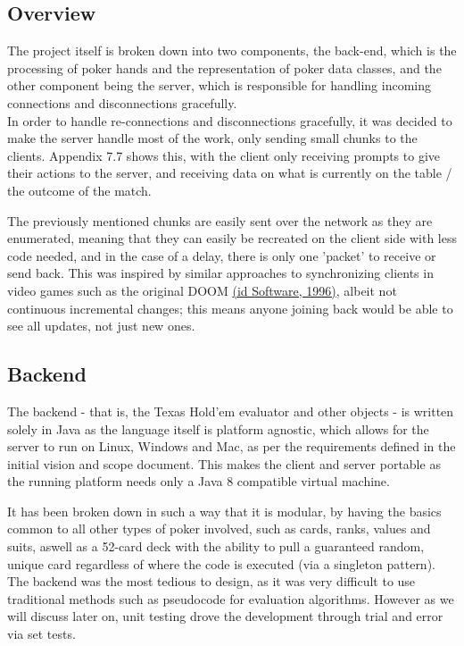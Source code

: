 \documentclass[11pt]{article}
\begin{document}
\subsection{Overview}

The project itself is broken down into two components, the back-end, which is the processing of poker hands and the representation of poker data classes, and the other component being the server, which is responsible for handling incoming connections and disconnections gracefully.  \\

In order to handle re-connections and disconnections gracefully, it was decided to make the server handle most of the work, only sending small chunks to the clients. Appendix 7.7 shows this, with the client only receiving prompts to give their actions to the server, and receiving data on what is currently on the table / the outcome of the match. 

The previously mentioned chunks are easily sent over the network as they are enumerated, meaning that they can easily be recreated on the client side with less code needed, and in the case of a delay, there is only one 'packet' to receive or send back. This was inspired by similar approaches to synchronizing clients in video games such as the original DOOM \hyperlink{doom_network}{(id Software, 1996)}, albeit not continuous incremental changes; this means anyone joining back would be able to see all updates, not just new ones. 


\subsection{Backend}

The backend - that is, the Texas Hold'em evaluator and other objects - is written solely in Java as the language itself is platform agnostic, which allows for the server to run on Linux, Windows and Mac, as per the requirements defined in the initial vision and scope document. This makes the client and server portable as the running platform needs only a Java 8 compatible virtual machine. 

It has been broken down in such a way that it is modular, by having the basics common to all other types of poker involved, such as cards, ranks, values and suits, aswell as a 52-card deck with the ability to pull a guaranteed random, unique card regardless of where the code is executed (via a singleton pattern). \\
The backend was the most tedious to design, as it was very difficult to use traditional methods such as pseudocode for evaluation algorithms. However as we will discuss later on, unit testing drove the development through trial and error via set tests. 
\end{document}
